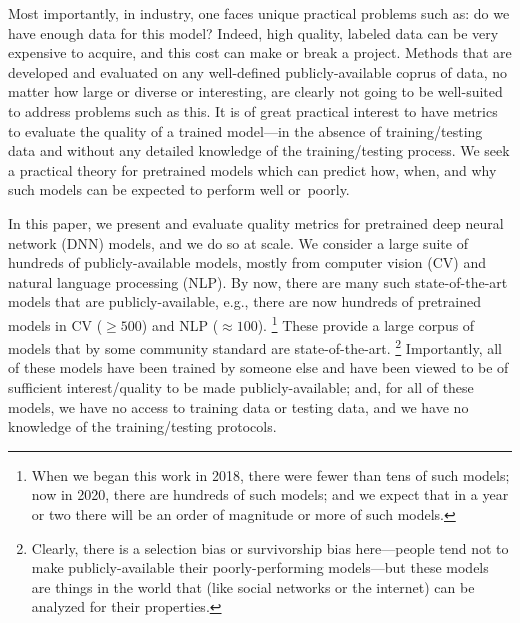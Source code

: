 Most importantly, in industry, one faces unique practical problems such as: do we have enough data for this model? 
Indeed, high quality, labeled data can be very expensive to acquire, and this cost can make or break a project.
Methods that are developed and evaluated on any well-defined publicly-available coprus of data, no matter how large or diverse or interesting, are clearly not going to be well-suited to address problems such as this.
It is of great practical interest to have metrics to evaluate the quality of a trained model---in the absence of training/testing data and without any detailed knowledge of the training/testing process.  
We seek a practical theory for pretrained models which can predict how, when, and why such models can be expected to perform well or~poorly.

In this paper, we present and evaluate quality metrics for pretrained deep neural network (DNN) models, and we do so at scale.
We consider a large suite of hundreds of publicly-available models, mostly from computer vision (CV) and natural language processing (NLP).
%
By now, there are many such state-of-the-art models that are publicly-available, e.g., 
there are now hundreds of pretrained models in CV ($\ge 500$) and NLP ($\approx 100$).%
\footnote{When we began this work in 2018, there were fewer than tens of such models; now in 2020, there are hundreds of such models; and we expect that in a year or two there will be an order of magnitude or more of such models.}
These provide a large corpus of models that by some community standard are state-of-the-art.%
\footnote{Clearly, there is a selection bias or survivorship bias here---people tend not to make publicly-available their poorly-performing models---but these models are things in the world that (like social networks or the internet) can be analyzed for their properties.}
Importantly, all of these models have been trained by someone else and have been viewed to be of sufficient interest/quality to be made publicly-available; and, for all of these models, we have no access to training data or testing data, and we have no knowledge of the training/testing protocols. 


